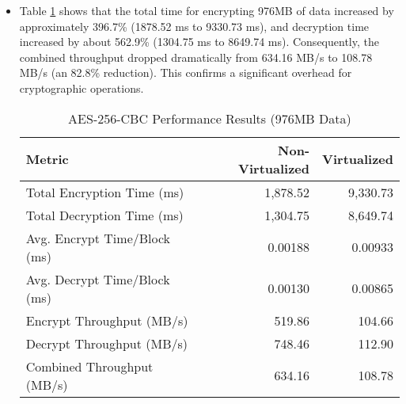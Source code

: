 \begin{itemize}
    \item {} Table \ref{tab:aes_performance_jurnal_ui_ana_en} shows that the total time for encrypting 976MB of data increased by approximately 396.7\% (1878.52 ms to 9330.73 ms), and decryption time increased by about 562.9\% (1304.75 ms to 8649.74 ms). Consequently, the combined throughput dropped dramatically from 634.16 MB/s to 108.78 MB/s (an 82.8\% reduction). This confirms a significant overhead for cryptographic operations.
          \begin{table}[H]
              \centering
              \caption{AES-256-CBC Performance Results (976MB Data)}
              \label{tab:aes_performance_jurnal_ui_ana_en}
              \fontsize{10}{12}\selectfont %
                  \begin{tabular}{@{}lrr@{}}
                      \toprule
                      \textbf{Metric}              & \textbf{Non-Virtualized} & \textbf{Virtualized} \\
                      \midrule
                      Total Encryption Time (ms)   & 1,878.52                 & 9,330.73             \\
                      Total Decryption Time (ms)   & 1,304.75                 & 8,649.74             \\
                      Avg. Encrypt Time/Block (ms) & 0.00188                  & 0.00933              \\
                      Avg. Decrypt Time/Block (ms) & 0.00130                  & 0.00865              \\
                      Encrypt Throughput (MB/s)    & 519.86                   & 104.66               \\
                      Decrypt Throughput (MB/s)    & 748.46                   & 112.90               \\
                      Combined Throughput (MB/s)   & 634.16                   & 108.78               \\
                      \bottomrule
                  \end{tabular}
          \end{table}

\end{itemize}

